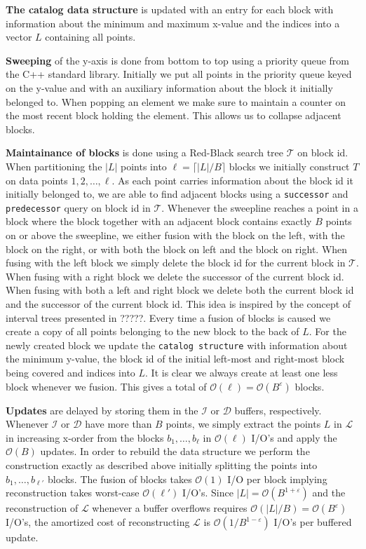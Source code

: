 \documentclass[twoside,11pt,openright]{report}
\def \epsilon {\varepsilon}
\begin{document}
\textbf{The catalog data structure} is updated with an entry for each block with information about the minimum and maximum x-value and the indices into a vector $L$ containing all points.

\textbf{Sweeping} of the y-axis is done from bottom to top using a priority queue from the C++ standard library. Initially we put all points in the priority queue keyed on the y-value and with an auxiliary information about the block it initially belonged to. When popping an element we make sure to maintain a counter on the most recent block holding the element. This allows us to collapse adjacent blocks.

\textbf{Maintainance of blocks} is done using a Red-Black search tree $\mathcal{T}$ on block id. When partitioning the $\vert L \vert$ points into $\ell = \lceil\lvert L \lvert / B\rceil$ blocks we initially construct $T$ on data points $1, 2, \dots, \ell$. As each point carries information about the block id it initially belonged to, we are able to find adjacent blocks using a \texttt{successor} and \texttt{predecessor} query on block id in $\mathcal{T}$. Whenever the sweepline reaches a point in a block where the block together with an adjacent block contains exactly $B$ points on or above the sweepline, we either fusion with the block on the left, with the block on the right, or with both the block on left and the block on right. When fusing with the left block we simply delete the block id for the current block in $\mathcal{T}$. When fusing with a right block we delete the successor of the current block id. When fusing with both a left and right block we delete both the current block id and the successor of the current block id. This idea is inspired by the concept of interval trees presented in ?????. %
Every time a fusion of blocks is caused we create a copy of all points belonging to the new block to the back of $L$. For the newly created block we update the \texttt{catalog structure} with information about the minimum y-value, the block id of the initial left-most and right-most block being covered and indices into $L$.
It is clear we always create at least one less block whenever we fusion. This gives a total of $\mathcal{O}(\ell) = \mathcal{O}(B^{\epsilon})$ blocks.

\textbf{Updates} are delayed by storing them in the $\mathcal{I}$ or $\mathcal{D}$ buffers, respectively. Whenever $\mathcal{I}$ or $\mathcal{D}$ have more than $B$ points, we simply extract the points $L$ in $\mathcal{L}$ in increasing x-order from the blocks $b_1, \dots, b_{\ell}$ in $\mathcal{O}(\ell)$ I/O's and apply the $\mathcal{O}(B)$ updates. In order to rebuild the data structure we perform the construction exactly as described above initially splitting the points into $b_1, \dots, b_{\ell'}$ blocks. The fusion of blocks takes $\mathcal{O}(1)$ I/O per block implying reconstruction takes worst-case $\mathcal{O}(\ell')$ I/O's. Since $\lvert L \lvert = \mathcal{O}(B^{1+\epsilon})$ and the reconstruction of $\mathcal{L}$ whenever a buffer overflows requires $\mathcal{O}(\lvert L \lvert / B) = \mathcal{O}(B^{\epsilon})$ I/O's, the amortized cost of reconstructing $\mathcal{L}$ is $\mathcal{O}(1/B^{1-\epsilon})$ I/O's per buffered update.
\end{document}
